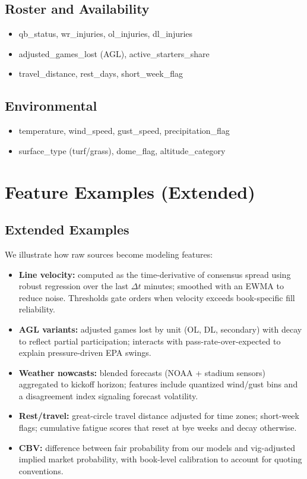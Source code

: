 \subsection{Roster and Availability}
\begin{itemize}
  \item qb\_status, wr\_injuries, ol\_injuries, dl\_injuries
  \item adjusted\_games\_lost (AGL), active\_starters\_share
  \item travel\_distance, rest\_days, short\_week\_flag
\end{itemize}

\subsection{Environmental}
\begin{itemize}
  \item temperature, wind\_speed, gust\_speed, precipitation\_flag
  \item surface\_type (turf/grass), dome\_flag, altitude\_category
\end{itemize}

\section{Feature Examples (Extended)}\label{app:feature-examples}

\subsection{Extended Examples}
We illustrate how raw sources become modeling features:
\begin{itemize}
  \item \textbf{Line velocity:} computed as the time-derivative of consensus spread using robust regression over the last $\Delta t$ minutes; smoothed with an EWMA to reduce noise. Thresholds gate orders when velocity exceeds book-specific fill reliability.
  \item \textbf{AGL variants:} adjusted games lost by unit (OL, DL, secondary) with decay to reflect partial participation; interacts with pass-rate-over-expected to explain pressure-driven EPA swings.
  \item \textbf{Weather nowcasts:} blended forecasts (NOAA + stadium sensors) aggregated to kickoff horizon; features include quantized wind/gust bins and a disagreement index signaling forecast volatility.
  \item \textbf{Rest/travel:} great-circle travel distance adjusted for time zones; short-week flags; cumulative fatigue scores that reset at bye weeks and decay otherwise.
  \item \textbf{CBV:} difference between fair probability from our models and vig-adjusted implied market probability, with book-level calibration to account for quoting conventions.
\end{itemize}


